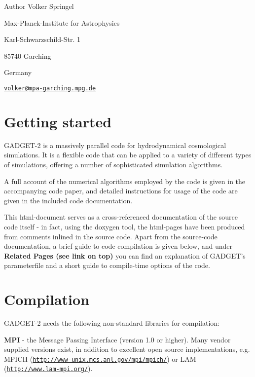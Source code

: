 \begin{DoxyAuthor}{Author}
Volker Springel \par
 Max-\/Planck-\/Institute for Astrophysics \par
 Karl-\/Schwarzschild-\/Str. 1 \par
 85740 Garching \par
 Germany \par
 \href{mailto:volker@mpa-garching.mpg.de}{\tt volker@mpa-\/garching.mpg.de} \par

\end{DoxyAuthor}
\par
\hypertarget{main_prelim}{}\section{Getting started}\label{main_prelim}
GADGET-\/2 is a massively parallel code for hydrodynamical cosmological simulations. It is a flexible code that can be applied to a variety of different types of simulations, offering a number of sophisticated simulation algorithms.

A full account of the numerical algorithms employed by the code is given in the accompanying code paper, and detailed instructions for usage of the code are given in the included code documentation.

This html-\/document serves as a cross-\/referenced documentation of the source code itself -\/ in fact, using the doxygen tool, the html-\/pages have been produced from comments inlined in the source code. Apart from the source-\/code documentation, a brief guide to code compilation is given below, and under {\bfseries Related Pages (see link on top)} you can find an explanation of GADGET's parameterfile and a short guide to compile-\/time options of the code.\hypertarget{main_install}{}\section{Compilation}\label{main_install}
GADGET-\/2 needs the following non-\/standard libraries for compilation:


\begin{DoxyItemize}
\item {\bfseries MPI} -\/ the Message Passing Interface (version 1.0 or higher). Many vendor supplied versions exist, in addition to excellent open source implementations, e.g. MPICH (\href{http://www-unix.mcs.anl.gov/mpi/mpich/}{\tt http://www-\/unix.mcs.anl.gov/mpi/mpich/}) or LAM (\href{http://www.lam-mpi.org/}{\tt http://www.lam-\/mpi.org/}).
\end{DoxyItemize}


